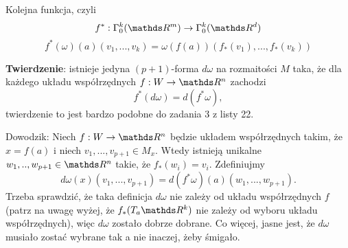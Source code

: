 \documentclass{article}
\begin{document}
Kolejna funkcja, czyli 
$$f^*:\Gamma^k_0(\R^m)\to\Gamma_0^k(\R^d)$$
$$f^*(\omega)(a)(v_1,...,v_k)=\omega(f(a))(f_*(v_1),...,f_*(v_k))$$

\textbf{\large\color{acc}Twierdzenie}: istnieje jedyna $(p+1)$-forma $d\omega$ na rozmaitości $M$ taka, że dla każdego układu współrzędnych $f:W\to \R^n$ zachodzi
$$f^*(d\omega)=d(f^*\omega),$$
twierdzenie to jest bardzo podobne do zadania 3 z listy 22.

{\color{acc}Dowodzik:} Niech $f:W\to\R^n$ będzie układem współrzędnych takim, że $x=f(a)$ i niech $v_1,...,v_{p+1}\in M_x$. Wtedy istnieją unikalne $w_1,..,w_{{p+1}}\in\R^n$ takie, że $f_*(w_i)=v_i$. Zdefiniujmy 
$$d\omega(x)(v_1,...,v_{p+1})=d(f^*\omega)(a)(w_1,...,w_{p+1}).$$
Trzeba sprawdzić, że taka definicja $d\omega$ nie zależy od układu współrzędnych $f$ (patrz na uwagę wyżej, że $f_*(T_a\R^k)$ nie zależy od wyboru układu współrzędnych), więc $d\omega$ zostało dobrze dobrane. Co więcej, jasne jest, że $d\omega$ musiało zostać wybrane tak a nie inaczej, żeby śmigało.
\end{document}
